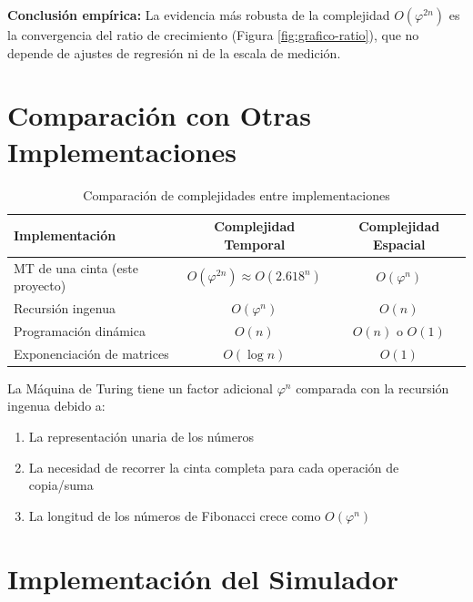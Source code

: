\documentclass[12pt,a4paper]{article}
\begin{document}
\textbf{Conclusión empírica:} La evidencia más robusta de la complejidad $O(\varphi^{2n})$ es la convergencia del ratio de crecimiento (Figura \ref{fig:grafico-ratio}), que no depende de ajustes de regresión ni de la escala de medición.

\newpage

\section{Comparación con Otras Implementaciones}

\begin{table}[H]
\centering
\begin{tabular}{lcc}
\toprule
\textbf{Implementación} & \textbf{Complejidad Temporal} & \textbf{Complejidad Espacial} \\
\midrule
MT de una cinta (este proyecto) & $O(\varphi^{2n}) \approx O(2.618^n)$ & $O(\varphi^n)$ \\
Recursión ingenua & $O(\varphi^n)$ & $O(n)$ \\
Programación dinámica & $O(n)$ & $O(n)$ o $O(1)$ \\
Exponenciación de matrices & $O(\log n)$ & $O(1)$ \\
\bottomrule
\end{tabular}
\caption{Comparación de complejidades entre implementaciones}
\end{table}

La Máquina de Turing tiene un factor adicional $\varphi^n$ comparada con la recursión ingenua debido a:
\begin{enumerate}
    \item La representación unaria de los números
    \item La necesidad de recorrer la cinta completa para cada operación de copia/suma
    \item La longitud de los números de Fibonacci crece como $O(\varphi^n)$
\end{enumerate}

\newpage

\section{Implementación del Simulador}
\end{document}
